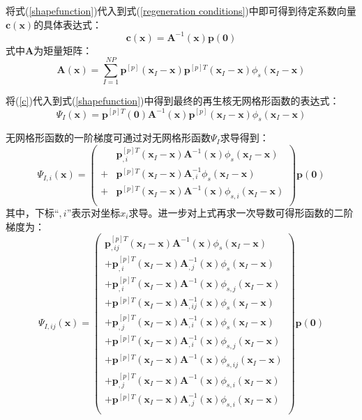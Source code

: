 将式(\ref{shapefunction})代入到式(\ref{regeneration conditions})中即可得到待定系数向量$\pmb{c}(\pmb{x})$的具体表达式：
\begin{equation}\label{c}
    \pmb{c}(\pmb{x})=\pmb{A}^{-1}(\pmb{x})\pmb{p}(\pmb{0})
\end{equation}
式中$\pmb{A}$为矩量矩阵：
\begin{equation}
        \pmb{A}(\pmb{x})=\sum_{I=1}^{N\!P}\pmb{p}^{[p]}(\pmb{x}_I-\pmb{x})\pmb{p}^{[p]T}(\pmb{x}_I-\pmb{x})\phi_s(\pmb{x}_I-\pmb{x})
\end{equation}\par
将(\ref{c})代入到式(\ref{shapefunction})中得到最终的再生核无网格形函数的表达式：
\begin{equation}\label{Pshapefunction}
        \Psi_I(\pmb{x})=\pmb{p}^{[p]T}(\pmb{0})\pmb{A}^{-1}(\pmb{x})\pmb{p}^{[p]}(\pmb{x}_I-\pmb{x})\phi_s(\pmb{x}_I-\pmb{x})
\end{equation}\par
无网格形函数的一阶梯度可通过对无网格形函数$\Psi_I$求导得到：
\begin{equation}
    \Psi_{I,i}(\pmb{x})=\left ( \begin{aligned}
    &\pmb p_{,i}^{[p]T}(\pmb x_I-\pmb x)\pmb A^{-1}(\pmb x)\phi_s(\pmb x_I-\pmb x)\\
    +&\pmb p^{[p]T}(\pmb x_I-\pmb x)\pmb A_{,i}^{-1}\phi_s(\pmb x_I-\pmb x)\\
    +&\pmb p^{[p]T}(\pmb x_I-\pmb x)\pmb A^{-1}(\pmb x)\phi _{s,i}(\pmb x_I-\pmb x)\\
    \end{aligned} \right)
    \pmb p(\pmb 0)
\end{equation}
其中，下标“$,i$”表示对坐标$x_i$求导。进一步对上式再求一次导数可得形函数的二阶梯度为：
\begin{equation}
    \Psi_{I,ij}(\pmb{x})=\left( \begin{aligned}
    \pmb p_{,ij}^{[p]T}(\pmb x_I-\pmb x)\pmb A^{-1}(\pmb x)\phi_s(\pmb x_I-\pmb x)\\
    +\pmb p_{,i}^{[p]T}(\pmb x_I-\pmb x)\pmb A_{,j}^{-1}(\pmb x)\phi_s(\pmb x_I-\pmb x)\\
    +\pmb p_{,i}^{[p]T}(\pmb x_I-\pmb x)\pmb A^{-1}(\pmb x)\phi_{s,j}(\pmb x_I-\pmb x)\\
    +\pmb p^{[p]T}(\pmb x_I-\pmb x)\pmb A_{,ij}^{-1}(\pmb x)\phi_s(\pmb x_I-\pmb x)\\
    +\pmb p_{,j}^{[p]T}(\pmb x_I-\pmb x)\pmb A_{,i}^{-1}(\pmb x)\phi_s(\pmb x_I-\pmb x)\\
    +\pmb p^{[p]T}(\pmb x_I-\pmb x)\pmb A_{,i}^{-1}(\pmb x)\phi_{s,j}(\pmb x_I-\pmb x)\\
    +\pmb p^{[p]T}(\pmb x_I-\pmb x)\pmb A^{-1}(\pmb x)\phi_{s,ij}(\pmb x_I-\pmb x)\\
    +\pmb p_{,j}^{[p]T}(\pmb x_I-\pmb x)\pmb A^{-1}(\pmb x)\phi_{s,i}(\pmb x_I-\pmb x)\\
    +\pmb p^{[p]T}(\pmb x_I-\pmb x)\pmb A_{,j}^{-1}(\pmb x)\phi_{s,i}(\pmb x_I-\pmb x)\\
   \end{aligned} \right)
    \pmb p(\pmb 0)
\end{equation}
